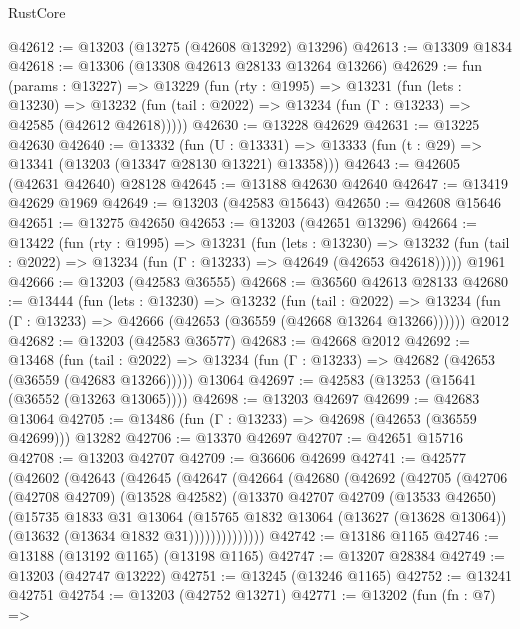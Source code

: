 \begin{lexlean}{RustCore}
\begin{coremodule}
@42612 := @13203 (@13275 (@42608 @13292) @13296)
@42613 := @13309 @1834
@42618 := @13306 (@13308 @42613 @28133 @13264 @13266)
@42629 := fun (params : @13227) =>
  @13229
    (fun (rty : @1995) =>
    @13231
      (fun (lets : @13230) =>
      @13232 (fun (tail : @2022) => @13234 (fun (Γ : @13233) => @42585 (@42612 @42618)))))
@42630 := @13228 @42629
@42631 := @13225 @42630
@42640 := @13332
    (fun (U : @13331) => @13333 (fun (t : @29) => @13341 (@13203 (@13347 @28130 @13221) @13358)))
@42643 := @42605 (@42631 @42640) @28128
@42645 := @13188 @42630 @42640
@42647 := @13419 @42629 @1969
@42649 := @13203 (@42583 @15643)
@42650 := @42608 @15646
@42651 := @13275 @42650
@42653 := @13203 (@42651 @13296)
@42664 := @13422
    (fun (rty : @1995) =>
    @13231
      (fun (lets : @13230) =>
      @13232 (fun (tail : @2022) => @13234 (fun (Γ : @13233) => @42649 (@42653 @42618)))))
    @1961
@42666 := @13203 (@42583 @36555)
@42668 := @36560 @42613 @28133
@42680 := @13444
    (fun (lets : @13230) =>
    @13232
      (fun (tail : @2022) =>
      @13234 (fun (Γ : @13233) => @42666 (@42653 (@36559 (@42668 @13264 @13266))))))
    @2012
@42682 := @13203 (@42583 @36577)
@42683 := @42668 @2012
@42692 := @13468
    (fun (tail : @2022) => @13234 (fun (Γ : @13233) => @42682 (@42653 (@36559 (@42683 @13266)))))
    @13064
@42697 := @42583 (@13253 (@15641 (@36552 (@13263 @13065))))
@42698 := @13203 @42697
@42699 := @42683 @13064
@42705 := @13486 (fun (Γ : @13233) => @42698 (@42653 (@36559 @42699))) @13282
@42706 := @13370 @42697
@42707 := @42651 @15716
@42708 := @13203 @42707
@42709 := @36606 @42699
@42741 := @42577
    (@42602
      (@42643
        (@42645
          (@42647
            (@42664
              (@42680
                (@42692
                  (@42705
                    (@42706
                      (@42708 @42709)
                      (@13528 @42582)
                      (@13370
                        @42707
                        @42709
                        (@13533 @42650)
                        (@15735
                          @1833
                          @31
                          @13064
                          (@15765
                            @1832
                            @13064
                            (@13627 (@13628 @13064))
                            (@13632 (@13634 @1832 @31))))))))))))))
@42742 := @13186 @1165
@42746 := @13188 (@13192 @1165) (@13198 @1165)
@42747 := @13207 @28384
@42749 := @13203 (@42747 @13222)
@42751 := @13245 (@13246 @1165)
@42752 := @13241 @42751
@42754 := @13203 (@42752 @13271)
@42771 := @13202
    (fun (fn : @7) =>

\end{coremodule}
\end{lexlean}
